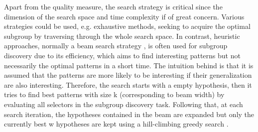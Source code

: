 Apart from the quality measure, the search strategy is critical since the dimension of the search space and time complexity if of great concern. Various strategies could be used, e.g. exhaustive methods, seeking to acquire the optimal subgroup by traversing through the whole search space. In contrast, heuristic approaches, normally a beam search strategy \cite{clark1989cn2}, is often used for subgroup discovery due to its efficiency, which aims to find interesting patterns but not necessarily the optimal patterns in a short time. The intuition behind is that it is assumed that the patterns are more likely to be interesting if their generalization are also interesting. Therefore, the search starts with a empty hypothesis, then it tries to find best patterns with size k (corresponding to beam width) by evaluating all selectors in the subgroup discovery task. Following that, at each search iteration, the hypotheses contained in the beam are expanded but only the currently best w hypotheses are kept using a hill-climbing greedy search \cite{atzmueller2015subgroup}. 




